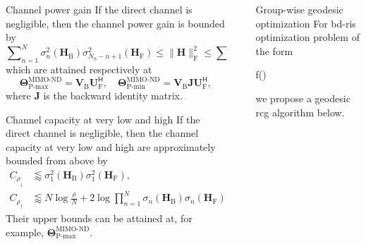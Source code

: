 \documentclass[final,xcolor={table}]{beamer}
\newlength{\sepwidth}
\newlength{\colwidth}
\newcommand{\separatorcolumn}{\begin{column}{\sepwidth}\end{column}}
\begin{document}
\begin{frame}[t]
\begin{columns}[t]
\begin{column}{\colwidth}
			\begin{coro}{Channel power gain}{}
				\setlength{\leftskip}{\leftmargini}
				\setlength{\rightskip}{\leftmargini}
				If the direct channel is negligible, then the channel power gain is bounded by
				\begin{equation*}
					\sum\nolimits_{n=1}^N \sigma_n^2(\mathbf{H}_\mathrm{B}) \sigma_{N_\mathrm{S}-n+1}^2(\mathbf{H}_\mathrm{F}) \le \lVert \mathbf{H} \rVert _\mathrm{F}^2 \le \sum\nolimits_{n=1}^N \sigma_n^2(\mathbf{H}_\mathrm{B}) \sigma_n^2(\mathbf{H}_\mathrm{F}),
				\end{equation*}
				which are attained respectively at
				\begin{equation*}
					\mathbf{\Theta}_\text{P-max}^\text{MIMO-ND} = \mathbf{V}_\mathrm{B} \mathbf{U}_\mathrm{F}^\mathsf{H}, \quad \mathbf{\Theta}_\text{P-min}^\text{MIMO-ND} = \mathbf{V}_\mathrm{B} \mathbf{J} \mathbf{U}_\mathrm{F}^\mathsf{H},
				\end{equation*}
				where $\mathbf{J}$ is the backward identity matrix.
			\end{coro}

			\begin{coro}{Channel capacity at very low and high }{}
				\setlength{\leftskip}{\leftmargini}
				\setlength{\rightskip}{\leftmargini}
				If the direct channel is negligible, then the channel capacity at very low and high  are approximately bounded from above by
				\begin{align*}
					C_{\rho_\downarrow} & \lessapprox \sigma_1^2(\mathbf{H}_\mathrm{B}) \sigma_1^2(\mathbf{H}_\mathrm{F}), \\
					C_{\rho_\uparrow} & \lessapprox N \log \frac{\rho}{N} + 2 \log \prod\nolimits_{n=1}^N \sigma_n(\mathbf{H}_\mathrm{B}) \sigma_n(\mathbf{H}_\mathrm{F}).
				\end{align*}
				Their upper bounds can be attained at, for example, $\mathbf{\Theta}_\text{P-max}^\text{MIMO-ND}$.
			\end{coro}
		\end{column}

		\separatorcolumn

		\begin{column}{\colwidth}
			\vspace{-0.5cm}
			\begin{algo}{Group-wise geodesic optimization}{}
				\setlength{\leftskip}{\leftmargini}
				\setlength{\rightskip}{\leftmargini}
				For \gls{bd}-\gls{ris} optimization problem of the form
				\begin{maxi*}
					{\scriptstyle{\mathbf{\Theta}}}{f(\mathbf{\Theta})}{}{}
					\addConstraint{\mathbf{\Theta}_g^\mathsf{H} \mathbf{\Theta}_g=\mathbf{I},}{\quad \forall g,}{}
				\end{maxi*}
				we propose a \textcolor{pink!50!pink!75!black}{geodesic} \gls{rcg} algorithm below.
				\vspace{0.5cm}


\end{algo}
\end{column}
\end{columns}
\end{frame}
\end{document}

